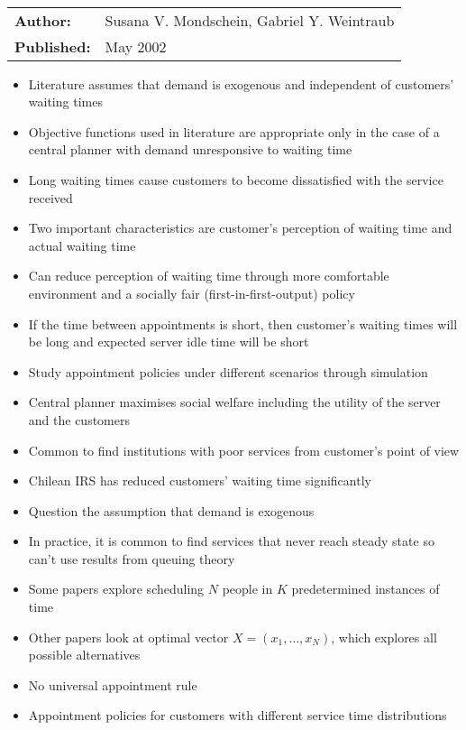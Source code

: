\documentclass{article}
\begin{document}
\ \newline

\begin{tabular}{l l}
    \textbf{Author:} & Susana V. Mondschein, Gabriel Y. Weintraub \\
    \textbf{Published:} & May 2002 \\
\end{tabular}

\begin{itemize}
	\item Literature assumes that demand is exogenous and independent of customers' waiting times
    \item Objective functions used in literature are appropriate only in the case of a central planner with demand unresponsive to waiting time
    \item Long waiting times cause customers to become dissatisfied with the service received
    \item Two important characteristics are customer's perception of waiting time and actual waiting time
    \item Can reduce perception of waiting time through more comfortable environment and a socially fair (first-in-first-output) policy
    \item If the time between appointments is short, then customer's waiting times will be long and expected server idle time will be short
    \item Study appointment policies under different scenarios through simulation
    \item Central planner maximises social welfare including the utility of the server and the customers
    \item Common to find institutions with poor services from customer's point of view
    \item Chilean IRS has reduced customers' waiting time significantly
    \item Question the assumption that demand is exogenous
    \item In practice, it is common to find services that never reach steady state so can't use results from queuing theory
    \item Some papers explore scheduling $N$ people in $K$ predetermined instances of time
    \item Other papers look at optimal vector $X = (x_{1}, \ldots, x_{N})$, which explores all possible alternatives
    \item No universal appointment rule
    \item Appointment policies for customers with different service time distributions

\end{itemize}
\end{document}
